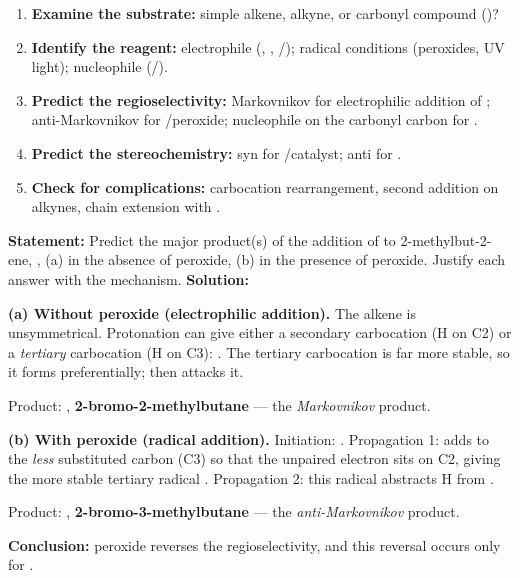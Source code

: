 \documentclass[11pt]{article}
\newcounter{popsec}
\newcounter{popsub}
\newcommand{\courssub}[1]{%
  \stepcounter{popsub}%
  \par\vspace{9pt}\noindent{\popxbold\fontsize{11.5}{13}\selectfont\color{popink}{\color{poporange}\thepopsec.\thepopsub}\hspace{6pt}#1}\par\nopagebreak\vspace{4pt}
}
\begin{document}
\begin{methode}
\begin{enumerate}
\item \textbf{Examine the substrate:} simple alkene, alkyne, or carbonyl compound ()?
\item \textbf{Identify the reagent:} electrophile (, , /); radical conditions (peroxides, UV light); nucleophile (/).
\item \textbf{Predict the regioselectivity:} Markovnikov for electrophilic addition of ; anti-Markovnikov for /peroxide; nucleophile on the carbonyl carbon for .
\item \textbf{Predict the stereochemistry:} syn for /catalyst; anti for .
\item \textbf{Check for complications:} carbocation rearrangement, second addition on alkynes, chain extension with .
\end{enumerate}
\end{methode}

\courssub{Worked Example}

\begin{exoresolu}
\textbf{Statement:} Predict the major product(s) of the addition of  to 2-methylbut-2-ene, , (a) in the absence of peroxide, (b) in the presence of peroxide. Justify each answer with the mechanism.
\tcblower
\textbf{Solution:}\par
\textbf{(a) Without peroxide (electrophilic addition).} The alkene is unsymmetrical. Protonation can give either a secondary carbocation (H on C2) or a \emph{tertiary} carbocation (H on C3): . The tertiary carbocation is far more stable, so it forms preferentially;  then attacks it.\par
Product: , \textbf{2-bromo-2-methylbutane} — the \emph{Markovnikov} product.\par
\textbf{(b) With peroxide (radical addition).} Initiation: . Propagation 1:  adds to the \emph{less} substituted carbon (C3) so that the unpaired electron sits on C2, giving the more stable tertiary radical . Propagation 2: this radical abstracts H from .\par
Product: , \textbf{2-bromo-3-methylbutane} — the \emph{anti-Markovnikov} product.\par
\textbf{Conclusion:} peroxide reverses the regioselectivity, and this reversal occurs only for .
\end{exoresolu}
\end{document}
